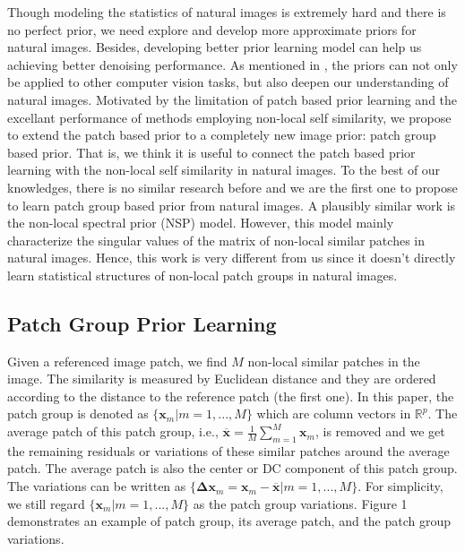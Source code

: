 \documentclass[10pt,twocolumn,letterpaper]{article}
\begin{document}
Though modeling the statistics of natural images is extremely hard and there is no perfect prior\cite{levin2012patch}, we need explore and develop more approximate priors for natural images. Besides, developing better prior learning model can help us achieving better denoising performance. As mentioned in \cite{levin2012patch}, the priors can not only be applied to other computer vision tasks, but also deepen our understanding of natural images. Motivated by the limitation of patch based prior learning \cite{epll} and the excellant performance of methods employing non-local self similarity\cite{bm3d}, we propose to extend the patch based prior to a completely new image prior: patch group based prior. That is, we think it is useful to connect the patch based prior learning with the non-local self similarity in natural images. To the best of our knowledges, there is no similar research before and we are the first one to propose to learn patch group based prior from natural images. A plausibly similar work is the non-local spectral prior (NSP) model\cite{nsp}. However, this model mainly characterize the singular values of the matrix of non-local similar patches in natural images. Hence, this work \cite{nsp} is very different from us since it doesn't directly learn statistical structures of non-local patch groups in natural images.
\subsection{Patch Group Prior Learning}
Given a referenced image patch, we find $M$ non-local similar patches in the image. The similarity is measured by Euclidean distance and they are ordered according to the distance to the reference patch (the first one). In this paper, the patch group is denoted as $\{\mathbf{x}_{m}|m=1,...,M\}$ which are column vectors in $\mathbb{R}^{p}$. The average patch of this patch group, i.e., $\mathbf{\overline{x}} = \frac{1}{M}\sum_{m=1}^{M}\mathbf{x}_{m}$, is removed and we get the remaining residuals or variations of these similar patches around the average patch. The average patch is also the center or DC component of this patch group. The variations can be written as $\{\mathbf{\Delta{x}}_{m} = \mathbf{x}_{m} - \mathbf{\overline{x}}|m=1,...,M\}$. For simplicity, we still regard  $\{\mathbf{x}_{m}|m=1,...,M\}$ as the patch group variations. Figure 1 demonstrates an example of patch group, its average patch, and the patch group variations.
\end{document}
